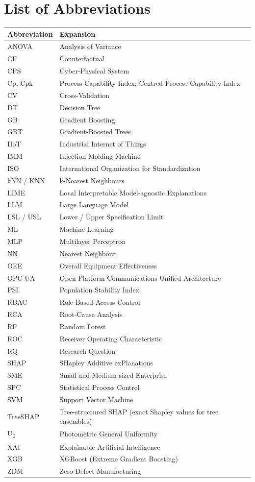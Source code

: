 \chapter*{List of Abbreviations}

\begin{longtable}{@{}ll@{}}
\toprule
\textbf{Abbreviation} & \textbf{Expansion} \\
\midrule
\endhead
ANOVA & Analysis of Variance \\
CF & Counterfactual \\
CPS & Cyber-Physical System \\
Cp, Cpk & Process Capability Index; Centred Process Capability Index \\
CV & Cross-Validation \\
DT & Decision Tree \\
GB & Gradient Boosting \\
GBT & Gradient-Boosted Trees \\
IIoT & Industrial Internet of Things \\
IMM & Injection Molding Machine \\
ISO & International Organization for Standardization \\
kNN / KNN & k-Nearest Neighbours \\
LIME & Local Interpretable Model-agnostic Explanations \\
LLM & Large Language Model \\
LSL / USL & Lower / Upper Specification Limit \\
ML & Machine Learning \\
MLP & Multilayer Perceptron \\
NN & Nearest Neighbour \\
OEE & Overall Equipment Effectiveness \\
OPC UA & Open Platform Communications Unified Architecture \\
PSI & Population Stability Index \\
RBAC & Role-Based Access Control \\
RCA & Root-Cause Analysis \\
RF & Random Forest \\
ROC & Receiver Operating Characteristic \\
RQ & Research Question \\
SHAP & SHapley Additive exPlanations \\
SME & Small and Medium-sized Enterprise \\
SPC & Statistical Process Control \\
SVM & Support Vector Machine \\
TreeSHAP & Tree-structured SHAP (exact Shapley values for tree ensembles) \\
U\textsubscript{0} & Photometric General Uniformity \\
XAI & Explainable Artificial Intelligence \\
XGB & XGBoost (Extreme Gradient Boosting) \\
ZDM & Zero-Defect Manufacturing \\
\bottomrule
\end{longtable}
